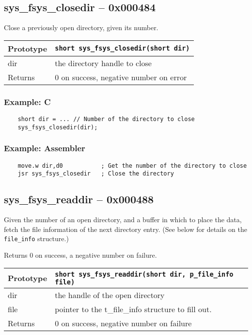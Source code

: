\subsection*{sys\_fsys\_closedir -- 0x000484}
Close a previously open directory, given its number.

\bigskip

\begin{tabular}{|l||l|} \hline
Prototype & \lstinline!short sys_fsys_closedir(short dir)! \\ \hline
dir & the directory handle to close \\ \hline
Returns & 0 on success, negative number on error \\ \hline
\end{tabular}

\subsubsection*{Example: C}
\begin{lstlisting}
    short dir = ... // Number of the directory to close
    sys_fsys_closedir(dir);
\end{lstlisting}

\subsubsection*{Example: Assembler}
\begin{verbatim}
    move.w dir,d0           ; Get the number of the directory to close
    jsr sys_fsys_closedir   ; Close the directory
\end{verbatim}


\subsection*{sys\_fsys\_readdir -- 0x000488}
Given the number of an open directory, and a buffer in which to place the data, fetch the file information of the next directory entry.
(See below for details on the \verb+file_info+ structure.)

Returns 0 on success, a negative number on failure.

\bigskip

\begin{tabular}{|l||l|} \hline
Prototype & \lstinline!short sys_fsys_readdir(short dir, p_file_info file)! \\ \hline
dir & the handle of the open directory \\ \hline
file & pointer to the t\_file\_info structure to fill out. \\ \hline
Returns & 0 on success, negative number on failure \\ \hline
\end{tabular}

